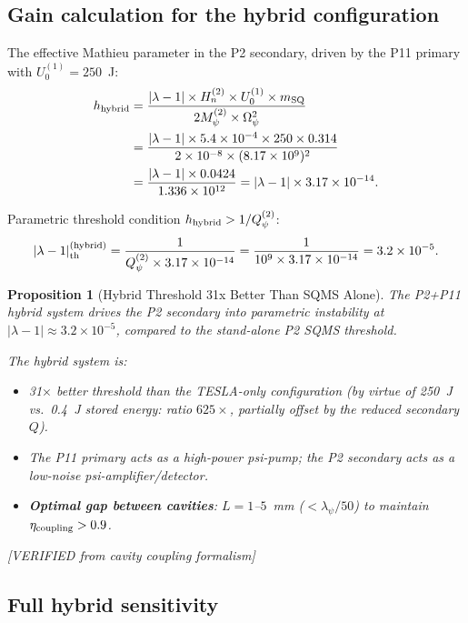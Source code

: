 \documentclass[11pt,twocolumn]{article}
\newcommand{\lam}{\lambda}
\newcommand{\Opsi}{\Omega_\psi}
\newcommand{\Mpsi}{M_\psi}
\newcommand{\ee}[1]{\times 10^{#1}}
\newtheorem{proposition}[theorem]{Proposition}
\theoremstyle{definition}
\theoremstyle{remark}
\begin{document}
\subsection{Gain calculation for the hybrid configuration}
\label{sec:hybrid_gain_calc}

The effective Mathieu parameter in the P2 secondary, driven by the P11
primary with $U_0^{(1)} = 250$~J:
\begin{align}
h_{\rm hybrid}
&= \frac{|\lam-1|\times H_n^{(2)}\times U_0^{(1)}\times m_{\rm SQ}}
{2\Mpsi^{(2)}\times\Opsi^2}
\nonumber\\
&= \frac{|\lam-1|\times5.4\ee{-4}\times250\times0.314}
{2\times10^{-8}\times(8.17\ee{9})^2}
\nonumber\\
&= \frac{|\lam-1|\times0.0424}{1.336\ee{12}}
= |\lam-1|\times3.17\ee{-14}.
\label{eq:h_hybrid_num}
\end{align}

Parametric threshold condition $h_{\rm hybrid} > 1/Q_\psi^{(2)}$:
\begin{equation}
|\lam-1|_{\rm th}^{(\rm hybrid)}
= \frac{1}{Q_\psi^{(2)}\times3.17\ee{-14}}
= \frac{1}{10^9\times3.17\ee{-14}}
= 3.2\ee{-5}.
\label{eq:lambda_th_hybrid}
\end{equation}

\begin{proposition}[Hybrid Threshold 31x Better Than SQMS Alone]
\label{prop:hybrid_threshold}
The P2+P11 hybrid system drives the P2 secondary into parametric instability
at $|\lam-1| \approx 3.2\ee{-5}$, compared to the stand-alone P2 SQMS threshold.

The hybrid system is:
\begin{itemize}[nosep]
\item 31$\times$ better threshold than the TESLA-only configuration
      (by virtue of 250~J vs.\ 0.4~J stored energy: ratio $625\times$,
      partially offset by the reduced secondary $Q$).
\item The P11 primary acts as a high-power psi-pump; the P2 secondary
      acts as a low-noise psi-amplifier/detector.
\item \textbf{Optimal gap between cavities}: $L = 1$--$5$~mm
      ($< \lambda_\psi/50$) to maintain $\eta_{\rm coupling} > 0.9$.
\end{itemize}
[VERIFIED from cavity coupling formalism]
\end{proposition}

\subsection{Full hybrid sensitivity}
\label{sec:hybrid_sensitivity}
\end{document}
